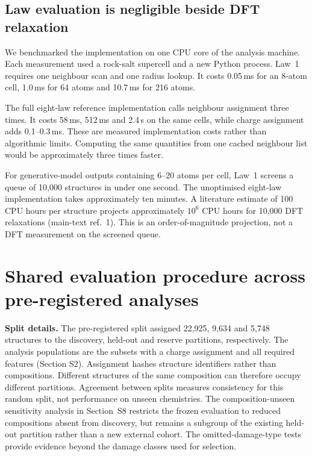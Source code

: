 \subsection{Law evaluation is negligible beside DFT relaxation}

We benchmarked the implementation on one CPU core of the analysis machine. Each
measurement used a rock-salt supercell and a new Python process. Law~1 requires one
neighbour scan and one radius lookup. It costs 0.05\,ms for an 8-atom cell, 1.0\,ms for
64 atoms and 10.7\,ms for 216 atoms.

The full eight-law reference implementation calls neighbour assignment three times. It
costs 58\,ms, 512\,ms and 2.4\,s on the same cells, while charge assignment adds
0.1--0.3\,ms. These are measured implementation costs rather than algorithmic limits.
Computing the same quantities from one cached neighbour list would be approximately three
times faster.

For generative-model outputs containing 6--20 atoms per cell, Law~1 screens a queue of
10{,}000 structures in under one second. The unoptimised eight-law implementation takes
approximately ten minutes. A literature estimate of 100 CPU hours per structure projects
approximately $10^6$ CPU hours for 10{,}000 DFT relaxations (main-text ref.~1). This is an
order-of-magnitude projection, not a DFT measurement on the screened queue.

\section{Shared evaluation procedure across pre-registered analyses}\label{note:s19}

\textbf{Split details.} The pre-registered split assigned 22{,}925, 9{,}634 and
5{,}748 structures to the discovery, held-out and reserve partitions, respectively. The
analysis populations are the subsets with a charge assignment and all required features
(Section S2). Assignment hashes structure identifiers rather than compositions. Different
structures of the same composition can therefore occupy different partitions. Agreement
between splits measures consistency for this random split, not performance on unseen
chemistries. The composition-unseen sensitivity analysis in Section~S8 restricts the frozen
evaluation to reduced compositions absent from discovery, but remains a subgroup of the
existing held-out partition rather than a new external cohort. The omitted-damage-type tests
provide evidence beyond the damage classes used for selection.

